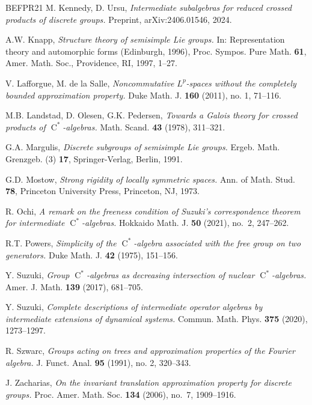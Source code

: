 \documentclass[11pt]{amsart}
\numberwithin{equation}{section}
\newcommand{\rC}{\operatorname{C}}
\theoremstyle{definition}
\begin{document}
\begin{thebibliography}{BEFPR21}
		 {\sc M. Kennedy, D. Ursu}, {\it Intermediate subalgebras for reduced crossed products of discrete groups.} Preprint, arXiv:2406.01546, 2024.
		
		 {\sc A.W. Knapp}, {\it Structure theory of semisimple Lie groups.} In: Representation theory and automorphic forms (Edinburgh, 1996), Proc. Sympos. Pure Math. {\bf 61}, Amer. Math. Soc., Providence, RI, 1997, 1--27.
		
		 {\sc V. Lafforgue, M. de la Salle}, {\it Noncommutative $L^p$-spaces without the completely bounded approximation property.} Duke Math. J. {\bf 160} (2011), no. 1, 71--116.

		 {\sc M.B. Landstad, D. Olesen, G.K. Pedersen}, {\it Towards a Galois theory for crossed products of $\rC^*$-algebras.} Math. Scand. {\bf 43} (1978), 311--321.
		
		 {\sc G.A. Margulis}, {\it Discrete subgroups of semisimple Lie groups.} Ergeb. Math. Grenzgeb. (3) {\bf 17}, Springer-Verlag, Berlin, 1991.
		
		 {\sc G.D. Mostow}, {\it Strong rigidity of locally symmetric spaces.} Ann. of Math. Stud. {\bf 78}, Princeton University Press, Princeton, NJ, 1973.

		 {\sc R. Ochi}, {\it A remark on the freeness condition of Suzuki's correspondence theorem for intermediate $\rC^*$-algebras.} Hokkaido Math. J. {\bf 50} (2021), no.~2, 247--262.
		
		 {\sc R.T. Powers}, {\it Simplicity of the $\rC^*$-algebra associated with the free group on two generators.} Duke Math. J. {\bf 42} (1975), 151--156.
		
		 {\sc Y. Suzuki}, {\it Group $\rC^*$-algebras as decreasing intersection of nuclear $\rC^*$-algebras.} Amer. J. Math. {\bf 139} (2017), 681--705.

		 {\sc Y. Suzuki}, {\it Complete descriptions of intermediate operator algebras by intermediate extensions of dynamical systems.} Commun. Math. Phys. {\bf 375} (2020), 1273--1297.
		
		 {\sc R. Szwarc}, {\it Groups acting on trees and approximation properties of the Fourier algebra.} J. Funct. Anal. {\bf 95} (1991), no. 2, 320--343.

		 {\sc J. Zacharias}, {\it On the invariant translation approximation property for discrete groups.} Proc. Amer. Math. Soc. {\bf 134} (2006), no.~7, 1909--1916.
		
	\end{thebibliography}
	
	
	
\end{document}
